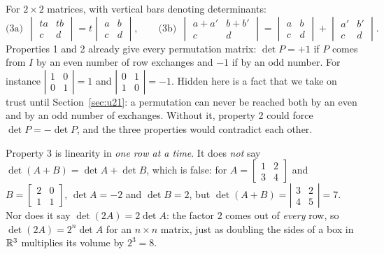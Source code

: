 For $2\times 2$ matrices, with vertical bars denoting determinants:
\[
  \text{(3a)}\ \ \begin{vmatrix}ta&tb\\c&d\end{vmatrix}=t\begin{vmatrix}a&b\\c&d\end{vmatrix},
  \qquad
  \text{(3b)}\ \ \begin{vmatrix}a+a'&b+b'\\c&d\end{vmatrix}
  =\begin{vmatrix}a&b\\c&d\end{vmatrix}+\begin{vmatrix}a'&b'\\c&d\end{vmatrix}.
\]
Properties 1 and 2 already give every permutation matrix: $\det P=+1$ if $P$ comes from $I$
by an even number of row exchanges and $-1$ if by an odd number. For instance
$\left|\begin{smallmatrix}1&0\\0&1\end{smallmatrix}\right|=1$ and
$\left|\begin{smallmatrix}0&1\\1&0\end{smallmatrix}\right|=-1$. Hidden here is a fact that we
take on trust until Section~\ref{sec:u21}: a permutation can never be reached both by an even
and by an odd number of exchanges. Without it, property 2 could force $\det P=-\det P$, and
the three properties would contradict each other.

\begin{trap}
Property 3 is linearity in \emph{one row at a time}. It does \emph{not} say
$\det(A+B)=\det A+\det B$, which is false: for
$A=\left[\begin{smallmatrix}1&2\\3&4\end{smallmatrix}\right]$ and
$B=\left[\begin{smallmatrix}2&0\\1&1\end{smallmatrix}\right]$, $\det A=-2$ and $\det B=2$,
but $\det(A+B)=\left|\begin{smallmatrix}3&2\\4&5\end{smallmatrix}\right|=7$. Nor does it say
$\det(2A)=2\det A$: the factor $2$ comes out of \emph{every} row, so
$\det(2A)=2^n\det A$ for an $n\times n$ matrix, just as doubling the sides of a box in
$\mathbb{R}^3$ multiplies its volume by $2^3=8$.
\end{trap}

